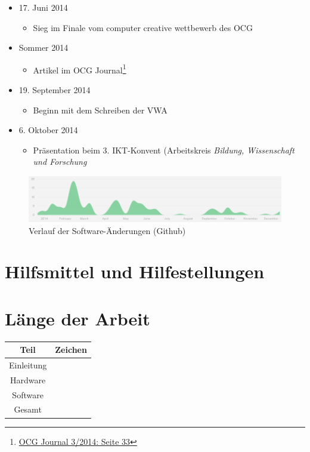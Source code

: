\documentclass[12pt,a4paper,oneside]{scrartcl}
\begin{document}
\begin{itemize}
\begin{itemize}
		\item Präsentation bei den \textsf{EDU|days}\footnote{\href{http://www.edudays.at/}{www.edudays.at}}
	\end{itemize}
	\item 17. Juni 2014
	\begin{itemize}
		\item Sieg im Finale vom \textsf{computer creative wettbewerb} des OCG
	\end{itemize}
	\item Sommer 2014
	\begin{itemize}
		\item Artikel im OCG Journal\footnote{\href{http://www.ocg.at/sites/ocg.at/files/medien/pdfs/OCG-Journal1403.pdf}{OCG Journal 3/2014: Seite 33}}
	\end{itemize}
	\item 19. September 2014
	\begin{itemize}
		\item Beginn mit dem Schreiben der VWA
	\end{itemize}
	\item 6. Oktober 2014
	\begin{itemize}
		\item Präsentation beim 3. IKT-Konvent (Arbeitskreis \emph{Bildung, Wissenschaft und Forschung}
	\end{itemize}

\end{itemize}

\begin{figure}[h]
  \centering
     \includegraphics[width=\textwidth]{figures/github_verlauf}
  \caption*{Verlauf der Software-Änderungen (Github)}
  \label{fig:github}
\end{figure}

\section{Hilfsmittel und Hilfestellungen}
\lipsum[1]
\section{Länge der Arbeit}
\begin{table}[h]
	\centering
	\label{länge}
	\begin{tabular}{c|c}
	Teil		&	Zeichen \\
	\hline\hline
	Einleitung	&	\\\hline
	Hardware	&	\\\hline
	Software	&	\\ \hline\hline
	Gesamt	&  
	\end{tabular}
\end{table}
\end{document}

